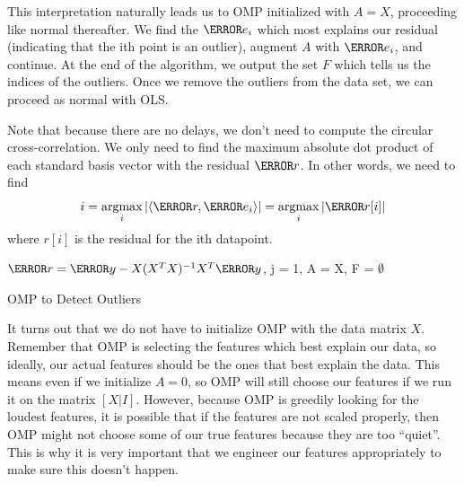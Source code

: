   This interpretation naturally leads us to OMP initialized with $A = X$, proceeding like normal thereafter.
  We find the $\V{e_i}$ which most explains our residual (indicating that the ith point is an outlier), augment $A$ with $\V{e_i}$, and continue.
  At the end of the algorithm, we output the set $F$ which tells us the indices of the outliers.
  Once we remove the outliers from the data set, we can proceed as normal with OLS.

  Note that because there are no delays, we don't need to compute the circular cross-correlation. 
  We only need to find the maximum absolute dot product of each standard basis vector with the residual $\V{r}$. In other words, we need to find
  \[
	i = \argmax_{i} |\langle \V{r}, \V{e_i} \rangle| = \argmax_{i}|\V{r}[i]|
  \]
  where $r[i]$ is the residual for the ith datapoint.
  \begin{algorithm}[!h]	
	\SetAlgoLined
	$\V{r} = \V{y} - X(X^TX)^{-1}X^T\V{y}$, j = 1, A = X, F = $\emptyset$\;
	\caption{OMP to Detect Outliers}
	\label{code:omp}
  \end{algorithm}

  It turns out that we do not have to initialize OMP with the data matrix $X$. Remember that OMP is selecting the features which best explain our data, so ideally, our actual features should be the ones that best explain the data.
  This means even if we initialize $A=0$, so OMP will still choose our features if we run it on the matrix $[X | I]$.
  However, because OMP is greedily looking for the loudest features, it is possible that if the features are not scaled properly, then OMP might not choose some of our true features because they are too ``quiet''.
  This is why it is very important that we engineer our features appropriately to make sure this doesn't happen.
